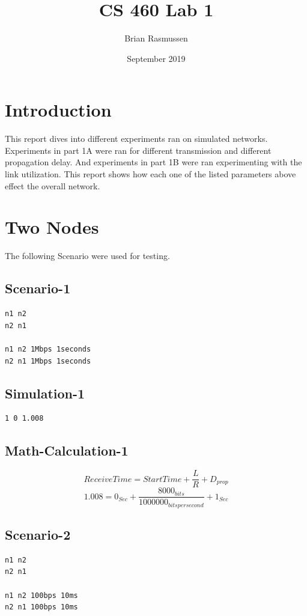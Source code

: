 \documentclass{article}
\title{CS 460 Lab 1}
\author{Brian Rasmussen}
\date{September 2019}
\begin{document}
\maketitle

\section{Introduction}
This report dives into different experiments ran on simulated networks.
Experiments in part 1A were ran for different transmission and different propagation delay.
And experiments in part 1B were ran experimenting with the link utilization.
This report shows how each one of the listed parameters above effect the overall network.
\section{Two Nodes}
The following Scenario were used for testing.
\subsection{Scenario-1}
\begin{verbatim}
n1 n2
n2 n1

n1 n2 1Mbps 1seconds
n2 n1 1Mbps 1seconds
\end{verbatim}
\subsection{Simulation-1}
\begin{verbatim}
1 0 1.008
\end{verbatim}
\subsection{Math-Calculation-1}
\begin{equation}
    Receive Time = StartTime + \frac {L}{R} + D_{prop}
\end{equation} 
\begin{equation}
    1.008 = 0_{Sec} + \frac {8000_{bits}}{1000000_{bits per second}} + 1_{Sec}
\end{equation}
\subsection{Scenario-2}
\begin{verbatim}
n1 n2
n2 n1

n1 n2 100bps 10ms
n2 n1 100bps 10ms
\end{verbatim}
\end{document}
